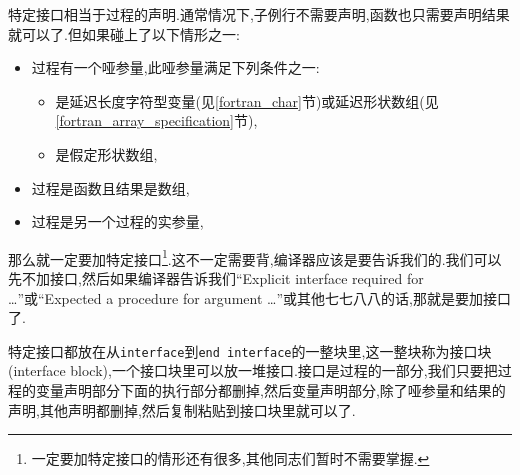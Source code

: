 特定接口相当于过程的声明.通常情况下,子例行不需要声明,函数也只需要声明结果就可以了.但如果碰上了以下情形之一:
\begin{itemize}
    \item 过程有一个哑参量,此哑参量满足下列条件之一:\begin{itemize}
        \item 是延迟长度字符型变量(见\ref{fortran_char}节)或延迟形状数组(见\ref{fortran_array_specification}节),
        \item 是假定形状数组,
    \end{itemize}
    \item 过程是函数且结果是数组,
    \item 过程是另一个过程的实参量,
\end{itemize}
那么就一定要加特定接口\footnote{一定要加特定接口的情形还有很多,其他同志们暂时不需要掌握.}.这不一定需要背,编译器应该是要告诉我们的.我们可以先不加接口,然后如果编译器告诉我们``Explicit interface required for \dots''或``Expected a procedure for argument \dots''或其他七七八八的话,那就是要加接口了.

特定接口都放在从\texttt{interface}到\texttt{end interface}的一整块里,这一整块称为接口块(interface block),一个接口块里可以放一堆接口.接口是过程的一部分,我们只要把过程的变量声明部分下面的执行部分都删掉,然后变量声明部分,除了哑参量和结果的声明,其他声明都删掉,然后复制粘贴到接口块里就可以了.

